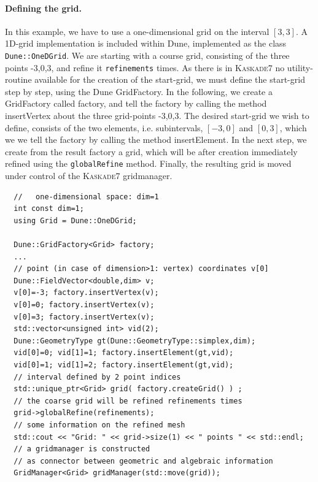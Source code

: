 \documentclass[11pt]{article}
\newcommand{\K}{\textsc{Kaskade7 }}
\begin{document}
\paragraph{Defining the grid.}
In this example, we have to use a one-dimensional grid on the interval $[3,3]$. A 1D-grid implementation is
included within Dune, implemented as the class {\tt Dune::OneDGrid}. We are starting with a course grid, consisting of the three points -3,0,3, and refine it {\tt refinements} times. As there is in \K no utility-routine available for the creation of the start-grid, we must define the start-grid step by step, using the Dune GridFactory. In the following, we create a GridFactory called factory, and tell the factory by calling the method insertVertex about the three grid-points -3,0,3. The desired start-grid we wish to define, consists of the two elements, i.e. subintervals, $[-3,0]$ and $[0,3]$, which we we tell the factory by calling the method insertElement. In the next step, we create from the result factory a grid, which will be after creation immediately refined using the {\tt globalRefine} method. Finally, the resulting grid is moved under control of the \K gridmanager.
\begin{lstlisting}
  //   one-dimensional space: dim=1
  int const dim=1;    
  using Grid = Dune::OneDGrid;

  Dune::GridFactory<Grid> factory;
  ...
  // point (in case of dimension>1: vertex) coordinates v[0]
  Dune::FieldVector<double,dim> v; 
  v[0]=-3; factory.insertVertex(v);
  v[0]=0; factory.insertVertex(v);
  v[0]=3; factory.insertVertex(v);
  std::vector<unsigned int> vid(2);
  Dune::GeometryType gt(Dune::GeometryType::simplex,dim);
  vid[0]=0; vid[1]=1; factory.insertElement(gt,vid);
  vid[0]=1; vid[1]=2; factory.insertElement(gt,vid);
  // interval defined by 2 point indices
  std::unique_ptr<Grid> grid( factory.createGrid() ) ;
  // the coarse grid will be refined refinements times
  grid->globalRefine(refinements);
  // some information on the refined mesh
  std::cout << "Grid: " << grid->size(1) << " points " << std::endl;
  // a gridmanager is constructed 
  // as connector between geometric and algebraic information
  GridManager<Grid> gridManager(std::move(grid)); 
\end{lstlisting}
\end{document}

